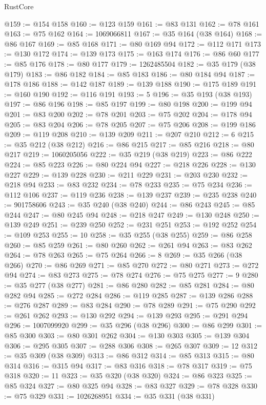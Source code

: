 \begin{lexlean}{RustCore}
\begin{coremodule}
@159 := @154 @158
@160 := @123 @159
@161 := @83 @131
@162 := @78 @161
@163 := @75 @162
@164 := 1069066811
@167 := @35 @164 (@38 @164)
@168 := @86 @167
@169 := @85 @168
@171 := @80 @169 @94
@172 := @112 @171
@173 := @130 @172
@174 := @139 @173
@175 := @163 @174
@176 := @86 @60
@177 := @85 @176
@178 := @80 @177
@179 := 1262485504
@182 := @35 @179 (@38 @179)
@183 := @86 @182
@184 := @85 @183
@186 := @80 @184 @94
@187 := @178 @186
@188 := @142 @187
@189 := @139 @188
@190 := @175 @189
@191 := @160 @190
@192 := @116 @191
@193 := 5
@196 := @35 @193 (@38 @193)
@197 := @86 @196
@198 := @85 @197
@199 := @80 @198
@200 := @199 @94
@201 := @83 @200
@202 := @78 @201
@203 := @75 @202
@204 := @178 @94
@205 := @83 @204
@206 := @78 @205
@207 := @75 @206
@208 := @199 @186
@209 := @119 @208
@210 := @139 @209
@211 := @207 @210
@212 := 6
@215 := @35 @212 (@38 @212)
@216 := @86 @215
@217 := @85 @216
@218 := @80 @217
@219 := 1060205056
@222 := @35 @219 (@38 @219)
@223 := @86 @222
@224 := @85 @223
@226 := @80 @224 @94
@227 := @218 @226
@228 := @130 @227
@229 := @139 @228
@230 := @211 @229
@231 := @203 @230
@232 := @218 @94
@233 := @83 @232
@234 := @78 @233
@235 := @75 @234
@236 := @112 @106
@237 := @119 @236
@238 := @139 @237
@239 := @235 @238
@240 := 901758606
@243 := @35 @240 (@38 @240)
@244 := @86 @243
@245 := @85 @244
@247 := @80 @245 @94
@248 := @218 @247
@249 := @130 @248
@250 := @139 @249
@251 := @239 @250
@252 := @231 @251
@253 := @192 @252
@254 := @109 @253
@255 := 10
@258 := @35 @255 (@38 @255)
@259 := @86 @258
@260 := @85 @259
@261 := @80 @260
@262 := @261 @94
@263 := @83 @262
@264 := @78 @263
@265 := @75 @264
@266 := 8
@269 := @35 @266 (@38 @266)
@270 := @86 @269
@271 := @85 @270
@272 := @80 @271
@273 := @272 @94
@274 := @83 @273
@275 := @78 @274
@276 := @75 @275
@277 := 9
@280 := @35 @277 (@38 @277)
@281 := @86 @280
@282 := @85 @281
@284 := @80 @282 @94
@285 := @272 @284
@286 := @119 @285
@287 := @139 @286
@288 := @276 @287
@289 := @83 @284
@290 := @78 @289
@291 := @75 @290
@292 := @261 @262
@293 := @130 @292
@294 := @139 @293
@295 := @291 @294
@296 := 1007099920
@299 := @35 @296 (@38 @296)
@300 := @86 @299
@301 := @85 @300
@303 := @80 @301 @262
@304 := @130 @303
@305 := @139 @304
@306 := @295 @305
@307 := @288 @306
@308 := @265 @307
@309 := 12
@312 := @35 @309 (@38 @309)
@313 := @86 @312
@314 := @85 @313
@315 := @80 @314
@316 := @315 @94
@317 := @83 @316
@318 := @78 @317
@319 := @75 @318
@320 := 11
@323 := @35 @320 (@38 @320)
@324 := @86 @323
@325 := @85 @324
@327 := @80 @325 @94
@328 := @83 @327
@329 := @78 @328
@330 := @75 @329
@331 := 1026268951
@334 := @35 @331 (@38 @331)

\end{coremodule}
\end{lexlean}
